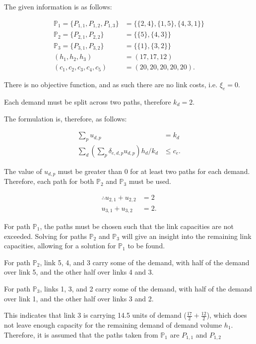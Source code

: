 The given information is as follows:

\begin{align*}
	\mathbb{P}_1 = \{P_{1,1}, P_{1,2}, P_{1,3}\} &=
	\{\{2,4\},\{1,5\},\{4,3,1\}\} \\
	\mathbb{P}_2 = \{P_{2,1}, P_{2,2}\} &= \{\{5\},\{4,3\}\} \\
	\mathbb{P}_3 = \{P_{3,1}, P_{3,2}\} &= \{\{1\},\{3,2\}\} \\
	(h_1, h_2, h_3) &= (17, 17, 12) \\
	(c_1, c_2, c_3, c_4, c_5) &= (20, 20, 20, 20, 20)
.\end{align*}

There is no objective function, and as such there are no link costs, i.e.
$\xi_e=0$.

Each demand must be split across two paths, therefore $k_d = 2$.

The formulation is, therefore, as follows:

\begin{align*}
	\sum_p u_{d,p} &= k_d \\
	\sum_d(\sum_p\delta_{e,d,p}u_{d,p})h_d/k_d &\le c_e
.\end{align*}

The value of $u_{d,p}$ must be greater than 0 for at least two paths for each
demand. Therefore, each path for both $\mathbb{P}_2$ and $\mathbb{P}_3$ must be
used.

 \begin{align*}
	 \therefore u_{2,1} + u_{2,2} &= 2 \\
	 u_{3,1} + u_{3,2} &= 2
.\end{align*}

For path $\mathbb{P}_1$, the paths must be chosen such that the link capacities
are not exceeded. Solving for paths  $\mathbb{P}_2$ and $\mathbb{P}_3$ will give
an insight into the remaining link capacities, allowing for a solution for
$\mathbb{P}_1$ to be found.

For path $\mathbb{P}_2$, link 5, 4, and 3 carry some of the demand, with half of
the demand over link 5, and the other half over links 4 and 3.

For path  $\mathbb{P}_3$, links 1, 3, and 2 carry some of the demand, with half
of the demand over link 1, and the other half over links 3 and 2.

This indicates that link 3 is carrying 14.5 units of demand
($\frac{17}{2}+\frac{12}{2}$), which does not leave enough capacity for the
remaining demand of demand volume $h_1$. Therefore, it is assumed that the paths
taken from $\mathbb{P}_1$ are  $P_{1,1}$ and  $P_{1,2}$
